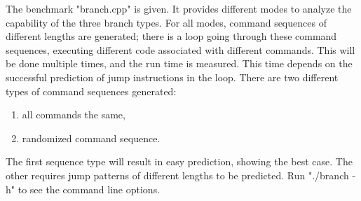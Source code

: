 \documentclass[a4paper,12pt]{exam}
\begin{document}
The benchmark "branch.cpp" is given. It provides different modes to analyze the capability of the
three branch types. For all modes, command sequences of different lengths are generated; there is a loop going
through these command sequences, executing different code associated with different commands. This will be done multiple
times, and the run time is measured. This time depends on the successful prediction of jump instructions in the
loop.
%
There are two different types of command sequences generated:
\begin{enumerate}
  \item all commands the same,
  \item randomized command sequence.
\end{enumerate}

The first sequence type will result in easy prediction, showing the best case.
The other requires jump patterns of different lengths to be predicted.
Run "./branch -h" to see the command line options.
\end{document}
